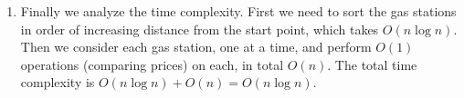 \documentclass[11pt]{article}
\begin{document}
\begin{enumerate}
\item Finally we analyze the time complexity. First we need to sort the gas stations in order of increasing distance from the start point, which takes $O(n\log n)$. Then we consider each gas station, one at a time, and perform $O(1)$ operations (comparing prices) on each, in total $O(n)$. The total time complexity is $O(n\log n) + O(n) = O(n \log n)$. 
\end{enumerate}
\end{document}
